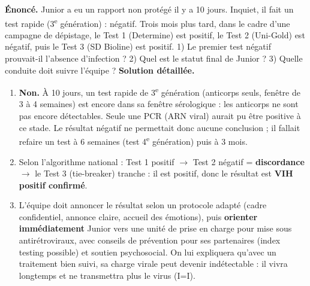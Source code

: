 \documentclass[11pt]{article}
\begin{document}
\begin{exoresolu}
\textbf{Énoncé.} Junior a eu un rapport non protégé il y a 10 jours. Inquiet, il fait un test rapide (3\textsuperscript{e} génération) : négatif. Trois mois plus tard, dans le cadre d'une campagne de dépistage, le Test 1 (Determine) est positif, le Test 2 (Uni-Gold) est négatif, puis le Test 3 (SD Bioline) est positif. 1) Le premier test négatif prouvait-il l'absence d'infection ? 2) Quel est le statut final de Junior ? 3) Quelle conduite doit suivre l'équipe ?
\tcblower
\textbf{Solution détaillée.}
\begin{enumerate}
\item \textbf{Non.} À 10 jours, un test rapide de 3\textsuperscript{e} génération (anticorps seuls, fenêtre de 3 à 4 semaines) est encore dans sa fenêtre sérologique : les anticorps ne sont pas encore détectables. Seule une PCR (ARN viral) aurait pu être positive à ce stade. Le résultat négatif ne permettait donc aucune conclusion ; il fallait refaire un test à 6 semaines (test 4\textsuperscript{e} génération) puis à 3 mois.
\item Selon l'algorithme national : Test 1 positif $\rightarrow$ Test 2 négatif = \textbf{discordance} $\rightarrow$ le Test 3 (tie-breaker) tranche : il est positif, donc le résultat est \textbf{VIH positif confirmé}.
\item L'équipe doit annoncer le résultat selon un protocole adapté (cadre confidentiel, annonce claire, accueil des émotions), puis \textbf{orienter immédiatement} Junior vers une unité de prise en charge pour mise sous antirétroviraux, avec conseils de prévention pour ses partenaires (index testing possible) et soutien psychosocial. On lui expliquera qu'avec un traitement bien suivi, sa charge virale peut devenir indétectable : il vivra longtemps et ne transmettra plus le virus (I=I).
\end{enumerate}
\end{exoresolu}
\end{document}
